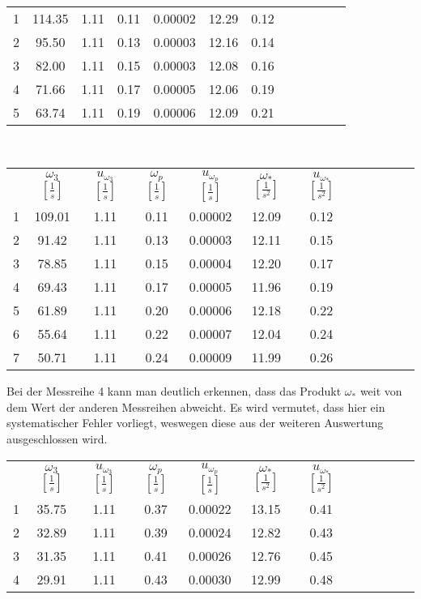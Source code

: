 \begin{center}
\begin{tabular}{gccccccccccc}
        1 &  114.35 &  1.11 &  0.11 &  0.00002 &  12.29 &  0.12 \\     
        2 &   95.50 &  1.11 &  0.13 &  0.00003 &  12.16 &  0.14 \\     
        3 &   82.00 &  1.11 &  0.15 &  0.00003 &  12.08 &  0.16 \\     
        4 &   71.66 &  1.11 &  0.17 &  0.00005 &  12.06 &  0.19 \\     
        5 &   63.74 &  1.11 &  0.19 &  0.00006 &  12.09 &  0.21 \\
    \end{tabular}\\
    \newpage
    \begin{tabular}{gccccccccccc}
         &      $\omega_3$ $[\frac{1}{s}]$ &  $u_{\omega_3}$ $[\frac{1}{s}]$ &    $\omega_p$ $[\frac{1}{s}]$ &     $u_{\omega_p}$ $[\frac{1}{s}]$ &     $\omega_*$ $[\frac{1}{s^2}]$&  $u_{\omega_*}$ $[\frac{1}{s^2}]$\\
        1 &  109.01 &  1.11 &  0.11 &  0.00002 &  12.09 &  0.12 \\     
        2 &   91.42 &  1.11 &  0.13 &  0.00003 &  12.11 &  0.15 \\     
        3 &   78.85 &  1.11 &  0.15 &  0.00004 &  12.20 &  0.17 \\     
        4 &   69.43 &  1.11 &  0.17 &  0.00005 &  11.96 &  0.19 \\     
        5 &   61.89 &  1.11 &  0.20 &  0.00006 &  12.18 &  0.22 \\     
        6 &   55.64 &  1.11 &  0.22 &  0.00007 &  12.04 &  0.24 \\      
        7 &   50.71 &  1.11 &  0.24 &  0.00009 &  11.99 &  0.26 \\ 
    \end{tabular}
\end{center}
Bei der Messreihe 4 kann man deutlich erkennen, dass das Produkt $\omega_*$ weit von dem Wert der anderen Messreihen abweicht. Es wird vermutet, dass hier ein systematischer Fehler vorliegt, weswegen diese aus der weiteren Auswertung ausgeschlossen wird. 
\begin{center}
    \begin{tabular}{gccccccccccc}
         &      $\omega_3$ $[\frac{1}{s}]$ &  $u_{\omega_3}$ $[\frac{1}{s}]$ &    $\omega_p$ $[\frac{1}{s}]$ &     $u_{\omega_p}$ $[\frac{1}{s}]$ &     $\omega_*$ $[\frac{1}{s^2}]$&  $u_{\omega_*}$ $[\frac{1}{s^2}]$\\
        1 &  35.75 &  1.11 &  0.37 &  0.00022 &  13.15 &  0.41 \\      
        2 &  32.89 &  1.11 &  0.39 &  0.00024 &  12.82 &  0.43 \\      
        3 &  31.35 &  1.11 &  0.41 &  0.00026 &  12.76 &  0.45 \\      
        4 &  29.91 &  1.11 &  0.43 &  0.00030 &  12.99 &  0.48 \\
    \end{tabular}
\end{center}
